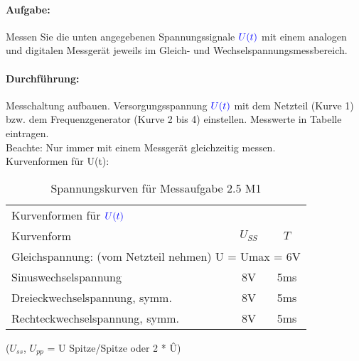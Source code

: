 \documentclass[a4paper,titlepage,parskip]{scrreprt}
\newcommand{\spannung}[1]{\textcolor{blue}{#1}}
\begin{document}
            \paragraph{Aufgabe:} Messen Sie die unten angegebenen Spannungssignale $\spannung{U(t)}$ mit einem analogen und digitalen Messgerät jeweils im Gleich- und Wechselspannungsmessbereich.
            \paragraph{Durchführung:} Messchaltung aufbauen. Versorgungsspannung $\spannung{U(t)}$ mit dem Netzteil (Kurve 1) bzw. dem Frequenzgenerator (Kurve 2 bis 4) einstellen. Messwerte in Tabelle eintragen.\\
            Beachte: Nur immer mit  einem   Messgerät gleichzeitig messen.\\
            
			\pagebreak			
			Kurvenformen für U(t):            
            \begin{center}
                \begin{table}[!hbtp]
                    \caption{Spannungskurven für Messaufgabe 2.5 M1}
                    \label{tbl:kurven2.1}
                    \renewcommand{\arraystretch}{1.3}
                    \begin{center}
                        \begin{tabular}{l|cc}
                            \multicolumn{3}{l}{Kurvenformen für $\spannung{U(t)}$}\\
                            Kurvenform & $U_{SS}$ & $T$\\ \hline
                            \multicolumn{3}{l}{Gleichspannung: (vom Netzteil nehmen)      U =  Umax = 6V}   \\
                            Sinuswechselspannung & 8V & 5ms   \\
                            Dreieckwechselspannung, symm.& 8V & 5ms\\   
                            Rechteckwechselspannung, symm.& 8V &5ms \\
                        \end{tabular}
                    \end{center}
                \end{table}
            \end{center}            
             

            
            ($U_{ss}$, $U_{pp}$ = U Spitze/Spitze oder 2 * Û) 
\end{document}
